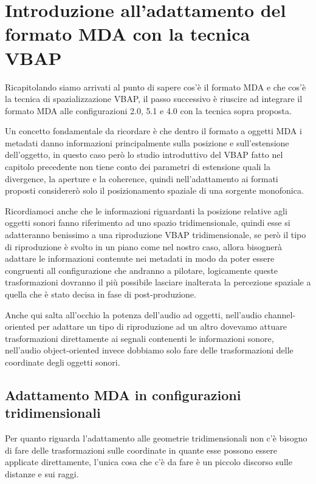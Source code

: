 \documentclass[12pt,a4paper]{report}
\begin{document}
\section{Introduzione all'adattamento del formato MDA con la tecnica VBAP}

Ricapitolando siamo arrivati al punto di sapere cos'è il formato MDA e che cos'è la tecnica di spazializzazione VBAP,
il passo successivo è riuscire ad integrare il formato MDA alle configurazioni 2.0, 5.1 e 4.0 con la tecnica sopra proposta.

Un concetto fondamentale da ricordare è che dentro il formato a oggetti MDA i metadati danno informazioni principalmente sulla posizione e sull'estensione dell'oggetto, in questo caso però lo studio introduttivo del VBAP fatto nel capitolo precedente non tiene conto dei parametri di estensione quali la divergence, la aperture e la coherence, quindi nell'adattamento ai formati proposti considererò solo il posizionamento spaziale di una sorgente monofonica.

Ricordiamoci anche che le informazioni riguardanti la posizione relative agli oggetti sonori fanno riferimento ad uno spazio tridimensionale, quindi esse si adatteranno benissimo a una riproduzione VBAP tridimensionale, se però il tipo di riproduzione è svolto in un piano come nel nostro caso, allora bisognerà adattare le informazioni contenute nei metadati in modo da poter essere congruenti all configurazione che andranno a pilotare, logicamente queste trasformazioni dovranno il più possibile lasciare inalterata la percezione spaziale a quella che è stato decisa in fase di post-produzione.

Anche qui salta all'occhio la potenza dell'audio ad oggetti, nell'audio channel-oriented per adattare un tipo di riproduzione ad un altro dovevamo attuare trasformazioni direttamente ai segnali contenenti le informazioni sonore, nell'audio object-oriented invece dobbiamo solo fare delle trasformazioni delle coordinate degli oggetti sonori.

\subsection{Adattamento MDA in configurazioni tridimensionali}

Per quanto riguarda l'adattamento alle geometrie tridimensionali non c'è bisogno di fare delle trasformazioni sulle coordinate in quante esse possono essere applicate direttamente, l'unica cosa che c'è da fare è un piccolo discorso sulle distanze e sui raggi.
\end{document}
